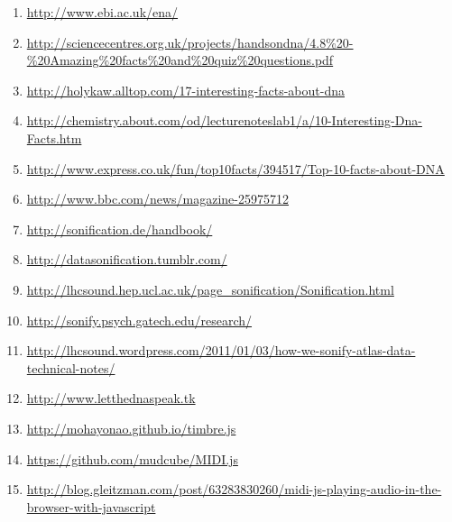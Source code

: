 \documentclass[12pt]{article}
\begin{document}
\begin{enumerate}
	\item \url{http://www.ebi.ac.uk/ena/}
	\item \url{http://sciencecentres.org.uk/projects/handsondna/4.8\%20-\%20Amazing\%20facts\%20and\%20quiz\%20questions.pdf}
	\item \url{http://holykaw.alltop.com/17-interesting-facts-about-dna}
	\item \url{http://chemistry.about.com/od/lecturenoteslab1/a/10-Interesting-Dna-Facts.htm}
	\item \url{http://www.express.co.uk/fun/top10facts/394517/Top-10-facts-about-DNA}
	\item \url{http://www.bbc.com/news/magazine-25975712}
	\item \url{http://sonification.de/handbook/}
	\item \url{http://datasonification.tumblr.com/}
	\item \url{http://lhcsound.hep.ucl.ac.uk/page_sonification/Sonification.html}
	\item \url{http://sonify.psych.gatech.edu/research/}
	\item \url{http://lhcsound.wordpress.com/2011/01/03/how-we-sonify-atlas-data-technical-notes/}
	\item \url{http://www.letthednaspeak.tk}
	\item \url{http://mohayonao.github.io/timbre.js}
	\item \url{https://github.com/mudcube/MIDI.js}
	\item \url{http://blog.gleitzman.com/post/63283830260/midi-js-playing-audio-in-the-browser-with-javascript}

\end{enumerate}
\end{document}

